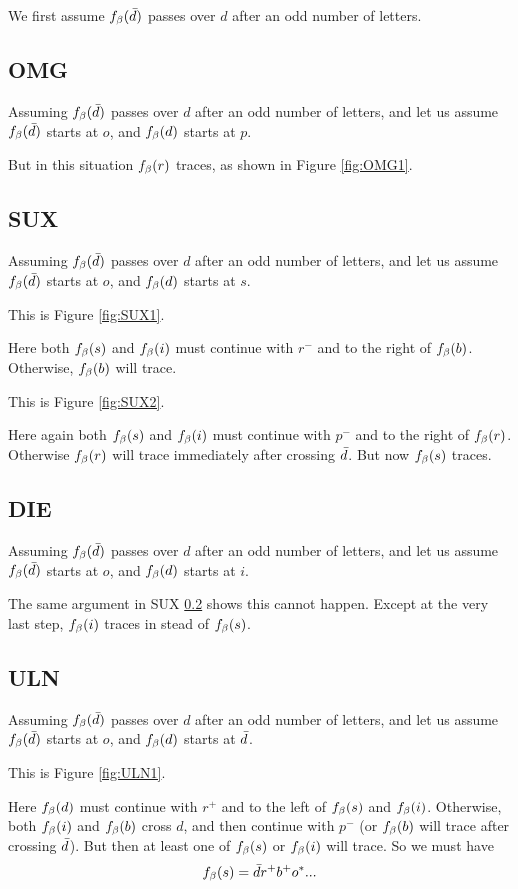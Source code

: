 We first assume $f_\beta(\bar{d})$ passes over $d$ after an odd number of letters. 

\subsection{OMG}\label{OMG}
Assuming $f_\beta(\bar{d})$ passes over $d$ after an odd number of letters, and let us assume $f_\beta(\bar{d})$ starts at $o$, and $f_\beta(d)$ starts at $p$.

But in this situation $f_\beta(r)$ traces, as shown in Figure \ref{fig:OMG1}.

\subsection{SUX}\label{SUX}
Assuming $f_\beta(\bar{d})$ passes over $d$ after an odd number of letters, and let us assume $f_\beta(\bar{d})$ starts at $o$, and $f_\beta(d)$ starts at $s$.

This is Figure \ref{fig:SUX1}.

Here both $f_\beta(s)$ and $f_\beta(i)$ must continue with $r^-$ and to the right of $f_\beta(b)$. Otherwise, $f_\beta(b)$ will trace.

This is Figure \ref{fig:SUX2}.

Here again both $f_\beta(s)$ and $f_\beta(i)$ must continue with $p^-$ and to the right of $f_\beta(r)$. Otherwise $f_\beta(r)$ will trace immediately after crossing $\bar{d}$. But now $f_\beta(s)$ traces.

\subsection{DIE}\label{DIE}
Assuming $f_\beta(\bar{d})$ passes over $d$ after an odd number of letters, and let us assume $f_\beta(\bar{d})$ starts at $o$, and $f_\beta(d)$ starts at $i$.

The same argument in SUX \ref{SUX} shows this cannot happen. Except at the very last step, $f_\beta(i)$ traces in stead of $f_\beta(s)$.

\subsection{ULN}\label{ULN}
Assuming $f_\beta(\bar{d})$ passes over $d$ after an odd number of letters, and let us assume $f_\beta(\bar{d})$ starts at $o$, and $f_\beta(d)$ starts at $\bar{d}$.

This is Figure \ref{fig:ULN1}.

Here $f_\beta(d)$ must continue with $r^+$ and to the left of $f_\beta(s)$ and $f_\beta(i)$. Otherwise, both $f_\beta(i)$ and $f_\beta(b)$ cross $d$, and then continue with $p^-$ (or $f_\beta(b)$ will trace after crossing $\bar{d}$). But then at least one of $f_\beta(s)$ or $f_\beta(i)$ will trace. So we must have
\[
f_\beta(s) = \bar{d} r^+ b^+ o^*...
\]

